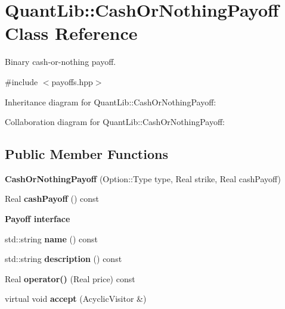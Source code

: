 \section{Quant\+Lib\+:\+:Cash\+Or\+Nothing\+Payoff Class Reference}
\label{class_quant_lib_1_1_cash_or_nothing_payoff}


Binary cash-\/or-\/nothing payoff.  




{\ttfamily \#include $<$payoffs.\+hpp$>$}



Inheritance diagram for Quant\+Lib\+:\+:Cash\+Or\+Nothing\+Payoff\+:


Collaboration diagram for Quant\+Lib\+:\+:Cash\+Or\+Nothing\+Payoff\+:
\subsection*{Public Member Functions}
\begin{DoxyCompactItemize}
\item 
{\bfseries Cash\+Or\+Nothing\+Payoff} (Option\+::\+Type type, Real strike, Real cash\+Payoff)\label{class_quant_lib_1_1_cash_or_nothing_payoff_ae4c4dd7c1133cb3a12a6f7b3840b50a5}

\item 
Real {\bfseries cash\+Payoff} () const \label{class_quant_lib_1_1_cash_or_nothing_payoff_a1936a6c1ac0475cd812a0aa0ccff3ff5}

\end{DoxyCompactItemize}
\begin{Indent}{\bf Payoff interface}\par
\begin{DoxyCompactItemize}
\item 
std\+::string {\bfseries name} () const \label{class_quant_lib_1_1_cash_or_nothing_payoff_ab2287a92902889c4992788ebdbf685e5}

\item 
std\+::string {\bfseries description} () const \label{class_quant_lib_1_1_cash_or_nothing_payoff_a63cdbadadfef9bb7b53b128ba759c1a5}

\item 
Real {\bfseries operator()} (Real price) const \label{class_quant_lib_1_1_cash_or_nothing_payoff_a558e2096d0f9518a660965a2397bac8a}

\item 
virtual void {\bfseries accept} (Acyclic\+Visitor \&)\label{class_quant_lib_1_1_cash_or_nothing_payoff_a482b6c502428a127b6c56c338236d844}

\end{DoxyCompactItemize}
\end{Indent}
